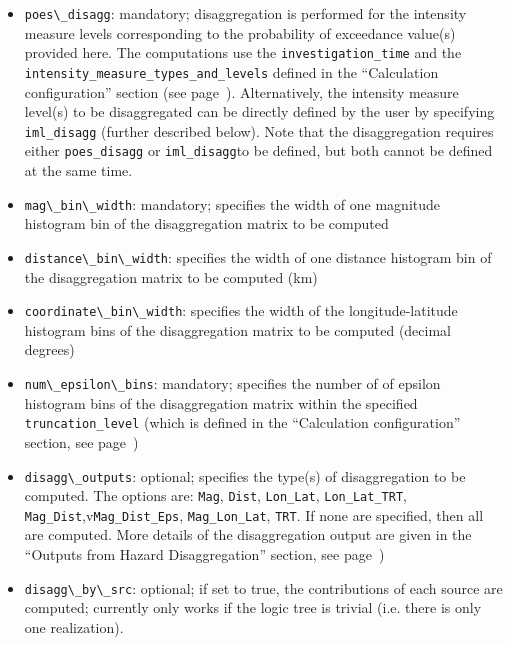 \begin{itemize}

    \item \Verb+poes\_disagg+: mandatory; disaggregation is performed for the intensity
    measure levels corresponding to the probability of exceedance value(s) provided
    here. The computations use the \texttt{investigation\_time} and the
    \texttt{intensity\_measure\_types\_and\_levels} defined in the
    ``Calculation configuration'' section   (see page~\pageref{sec:calculation_configuration}).
    Alternatively, the intensity measure level(s) to be disaggregated can be directly defined
    by the user by specifying \texttt{iml\_disagg} (further described below). Note that the
    disaggregation requires either \texttt{poes\_disagg} or \texttt{iml\_disagg}to be defined,
    but both cannot be defined at the same time.

    \item \Verb+mag\_bin\_width+: mandatory; specifies the width of one magnitude
     histogram bin of the disaggregation matrix to be computed

    \item \Verb+distance\_bin\_width+: specifies the width of one distance
    histogram bin of the disaggregation matrix to be computed (km)

    \item \Verb+coordinate\_bin\_width+: specifies the width of the longitude-latitude
    histogram bins of the disaggregation matrix to be computed (decimal degrees)

    \item \Verb+num\_epsilon\_bins+: mandatory; specifies the number of of epsilon
    histogram bins of the disaggregation matrix within the specified \texttt{truncation\_level}
    (which is defined in the ``Calculation configuration'' section,
    see page~\pageref{sec:calculation_configuration})

    \item \Verb+disagg\_outputs+: optional; specifies the type(s) of disaggregation
    to be computed. The options are: \texttt{Mag}, \texttt{Dist}, \texttt{Lon\_Lat},
    \texttt{Lon\_Lat\_TRT}, \texttt{Mag\_Dist},v\texttt{Mag\_Dist\_Eps},
    \texttt{Mag\_Lon\_Lat}, \texttt{TRT}. If none are specified, then all are
    computed. More details of the disaggregation output are given in the
    ``Outputs from Hazard Disaggregation'' section,
    see page~\pageref{sec:output_hazard_disaggregation})

    \item \Verb+disagg\_by\_src+: optional; if set to true, the contributions of
    each source are computed; currently only works if the logic tree is trivial
    (i.e. there is only one realization).

\end{itemize}

